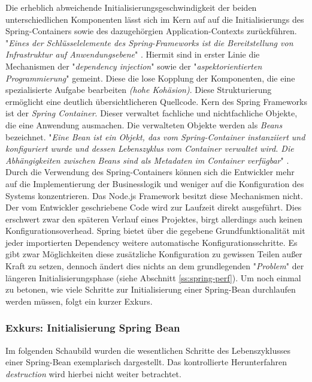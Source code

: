 Die erheblich abweichende Initialisierungsgeschwindigkeit der beiden unterschiedlichen Komponenten lässt sich im Kern auf auf die Initialisierungs des Spring-Containers sowie des dazugehörgien Application-Contexts zurückführen. "\emph{Eines der Schlüsselelemente des Spring-Frameworks ist die Bereitstellung von Infrastruktur auf Anwendungsebene}" \cite[Seite~53 ff.]{simons-spring}. Hiermit sind in erster Linie die Mechanismen der "\emph{dependency injection}" sowie der "\emph{aspektorientierten Programmierung}" gemeint. Diese die lose Kopplung der Komponenten, die eine spezialisierte Aufgabe bearbeiten \emph{(hohe Kohäsion)}. Diese Strukturierung ermöglicht eine deutlich übersichtlicheren Quellcode. Kern des Spring Frameworks ist der \emph{Spring Container}. Dieser verwaltet fachliche und nichtfachliche Objekte, die eine Anwendung ausmachen. Die verwalteten Objekte werden als \emph{Beans} bezeichnet. "\emph{Eine Bean ist ein Objekt, das vom Spring-Container instanziiert und konfiguriert wurde und dessen Lebenszyklus vom Container verwaltet wird. Die Abhängigkeiten zwischen Beans sind als Metadaten im Container verfügbar}" \cite[Kapitel~3.1.1]{simons-spring}. Durch die Verwendung des Spring-Containers können sich die Entwickler mehr auf die Implementierung der Businesslogik und weniger auf die Konfiguration des Systems konzentrieren. Das Node.js Framework besitzt diese Mechanismen nicht. Der vom Entwickler geschriebene Code wird zur Laufzeit direkt ausgeführt. Dies erschwert zwar den späteren Verlauf eines Projektes, birgt allerdings auch keinen Konfigurationsoverhead. Spring bietet über die gegebene Grundfunktionalität mit jeder importierten Dependency weitere automatische Konfigurationsschritte. Es gibt zwar Möglichkeiten diese zusätzliche Konfiguration zu gewissen Teilen außer Kraft zu setzen, dennoch ändert dies nichts an dem grundlegenden "\emph{Problem}" der längeren Initialisierungsphase (siehe Abschnitt \ref{ss:spring-perf}). Um noch einmal zu betonen, wie viele Schritte zur Initialisierung einer Spring-Bean durchlaufen werden müssen, folgt ein kurzer Exkurs.

\subsubsection{Exkurs: Initialisierung Spring Bean}
Im folgenden Schaubild wurden die wesentlichen Schritte des Lebenszyklusses einer Spring-Bean exemplarisch dargestellt. Das kontrollierte Herunterfahren \emph{destruction} wird hierbei nicht weiter betrachtet. 

